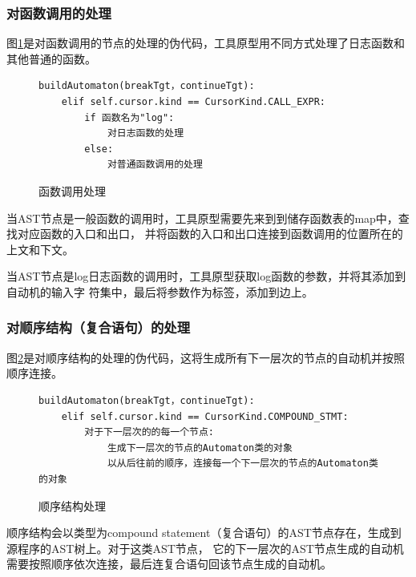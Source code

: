 \subsubsection{对函数调用的处理}
图\ref{函数调用处理}是对函数调用的节点的处理的伪代码，工具原型用不同方式处理了日志函数和其他普通的函数。

\begin{figure}[ht]
\centering
\begin{minipage}{9cm}
\begin{lstlisting}
buildAutomaton(breakTgt，continueTgt): 
    elif self.cursor.kind == CursorKind.CALL_EXPR:
        if 函数名为"log":
            对日志函数的处理
        else:
            对普通函数调用的处理
\end{lstlisting}
\end{minipage}
    \caption{函数调用处理}
    \label{函数调用处理}
\end{figure}

当AST节点是一般函数的调用时，工具原型需要先来到到储存函数表的map中，查找对应函数的入口和出口，
并将函数的入口和出口连接到函数调用的位置所在的上文和下文。

当AST节点是log日志函数的调用时，工具原型获取log函数的参数，并将其添加到自动机的输入字
符集中，最后将参数作为标签，添加到边上。

\subsubsection{对顺序结构（复合语句）的处理}
图\ref{顺序结构处理}是对顺序结构的处理的伪代码，这将生成所有下一层次的节点的自动机并按照顺序连接。\\
\begin{figure}[ht]
\centering
\begin{minipage}{14cm}
\begin{lstlisting}
buildAutomaton(breakTgt，continueTgt): 
    elif self.cursor.kind == CursorKind.COMPOUND_STMT:
        对于下一层次的的每一个节点:  
            生成下一层次的节点的Automaton类的对象
            以从后往前的顺序，连接每一个下一层次的节点的Automaton类的对象
\end{lstlisting}
\end{minipage}
    \caption{顺序结构处理}
    \label{顺序结构处理}
\end{figure}

顺序结构会以类型为compound statement（复合语句）的AST节点存在，生成到源程序的AST树上。对于这类AST节点，
它的下一层次的AST节点生成的自动机需要按照顺序依次连接，最后连复合语句回该节点生成的自动机。

